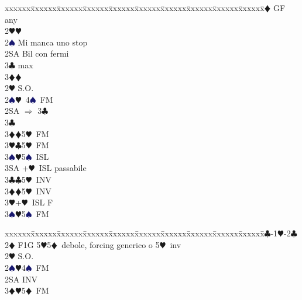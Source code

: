 \documentclass[a4paper,italian]{article}
\newcommand{\BC}{\textcolor{OliveGreen}{$\clubsuit$}}
\newcommand{\BD}{\textcolor{RedOrange}{$\vardiamondsuit$}}
\newcommand{\BH}{\textcolor{Red2}{$\varheartsuit${}}}
\newcommand{\BS}{\textcolor{MidnightBlue}{$\spadesuit${}}}
\newenvironment{bidtable}
{\begin{tabbing}

    xxxxxx\=xxxxxx\=xxxxxx\=xxxxxx\=xxxxxx\=xxxxxx\=xxxxxx\=xxxxxx\=xxxxxx\=xxxxxx\=\kill}
{\end{tabbing} }%
\begin{document}
\begin{multicols}{2}
\begin{bidtable}
                                        2\BD \> GF any\+\\
                                        2\BH {}\BH \\
                                        2\BS \> Mi manca uno stop\\
                                        2SA \> Bil con fermi\\
                                        3\BC {} max\\
                                        3\BD {}\BD \-\\
                                        [2pt]2\BH \> S.O.\\
                                        [2pt]2\BS {}\BH\ 4\BS\ FM\\
                                        2SA \> $\Rightarrow$ 3\BC \+\\
                                        3\BC\+\\
                                        3\BD {}\BD 5\BH\ FM\\
                                        3\BH {}\BC 5\BH\ FM\\
                                        3\BS {}\BH 5\BS\ ISL\\
                                        3SA +\BH\ ISL passabile\-\-\\
                                        3\BC {}\BC 5\BH\ INV\\
                                        3\BD {}\BD 5\BH\ INV\\
                                        3\BH {}+\BH\ ISL F\\
                                        3\BS {}\BH 5\BS\ FM\-
                                    \end{bidtable}
                                    \bigbreak
                                    \begin{bidtable}
                                        1\BC-1\BH-2\BC\+\\
                                        2\BD \> F1G 5\BH 5\BD\ debole, forcing generico o 5\BH\ inv\\
                                        2\BH \> S.O.\\
                                        2\BS {}\BH 4\BS\ FM\\
                                        2SA \> INV\\
                                        3\BD {}\BH 5\BD\ FM\\

\end{bidtable}
\end{multicols}
\end{document}
